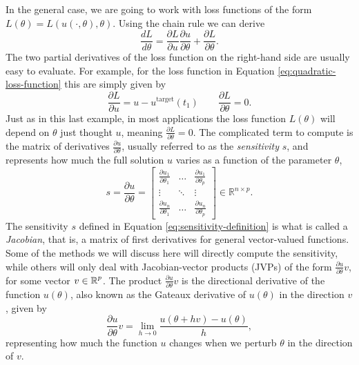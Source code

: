 In the general case, we are going to work with loss functions of the form $L(\theta) = L(u(\cdot, \theta), \theta)$. 
Using the chain rule we can derive 
\begin{equation} 
 \frac{dL}{d\theta} = \frac{\partial L}{\partial u} \frac{\partial u}{\partial \theta} + \frac{\partial L}{\partial \theta}.
 \label{eq:dLdtheta_VJP}
\end{equation} 
The two partial derivatives of the loss function on the right-hand side are usually easy to evaluate.
For example, for the loss function in Equation \eqref{eq:quadratic-loss-function} this are simply given by 
\begin{equation}
    \frac{\partial L}{\partial u} = u - u^{\text{target}}(t_1)
    \qquad 
    \frac{\partial L}{\partial \theta} = 0.
    \label{eq:dLdu}
\end{equation}
Just as in this last example, in most applications the loss function $L(\theta)$ will depend on $\theta$ just thought $u$, meaning $\frac{\partial L}{\partial \theta} = 0$.
The complicated term to compute is the matrix of derivatives $\frac{\partial u}{\partial \theta}$, usually referred to as the \textit{sensitivity} $s$, and represents how much the full solution $u$ varies as a function of the parameter $\theta$, 
\begin{equation}
 s 
 = 
 \frac{\partial u}{\partial \theta} 
 =
 \begin{bmatrix}
   \frac{\partial u_1}{\partial \theta_1} & \dots & \frac{\partial u_1}{\partial \theta_p} \\
   \vdots & \ddots & \vdots \\
   \frac{\partial u_n}{\partial \theta_1} & \dots & \frac{\partial u_n}{\partial \theta_p}
 \end{bmatrix}
 \in \mathbb R^{n \times p}.
 \label{eq:sensitivity-definition}
\end{equation}
The sensitivity $s$ defined in Equation \eqref{eq:sensitivity-definition} is what is called a \textit{Jacobian}, that is, a matrix of first derivatives for general vector-valued functions.
Some of the methods we will discuss here will directly compute the sensitivity, while others will only deal with Jacobian-vector products (JVPs) of the form $\frac{\partial u}{\partial \theta} v$, for some vector $v \in \operatorname{\mathbb{R}}^p$. 
The product $\frac{\partial u}{\partial \theta}v$ is the directional derivative of the function $u(\theta)$, also known as the Gateaux derivative of $u(\theta)$ in the direction $v$, given by 
\begin{equation}
    \frac{\partial u}{\partial \theta} v 
    = 
    \lim_{h \rightarrow 0} \frac{u(\theta + h v) - u(\theta)}{h},
    \label{eq:directional-derivative}
\end{equation}
representing how much the function $u$ changes when we perturb $\theta$ in the direction of $v$. 

